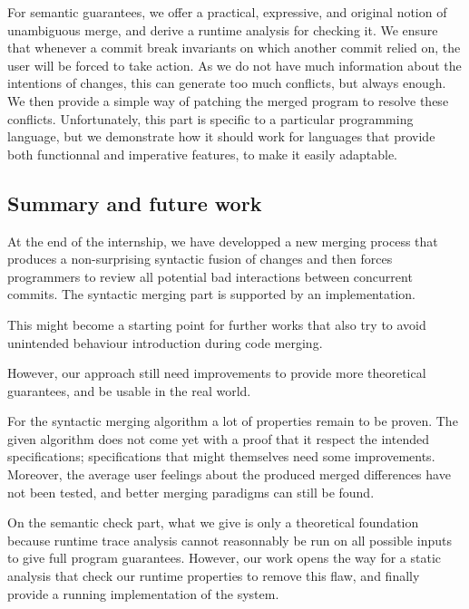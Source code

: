 \documentclass[a4paper,11pt]{article}
\newcommand\todo[1]{{\color{teal}(\textbf{TODO:} #1)}}
\begin{document}
For semantic guarantees, we offer a practical, expressive, and original notion of unambiguous merge, and derive a runtime analysis for checking it. We ensure that whenever a commit break invariants on which another commit relied on, the user will be forced to take action. As we do not have much information about the intentions of changes, this can generate too much conflicts, but always enough. We then provide a simple way of patching the merged program to resolve these conflicts.
Unfortunately, this part is specific to a particular programming language, but we demonstrate how it should work for languages that provide both functionnal and imperative features, to make it easily adaptable.

\subsection*{Summary and future work}


At the end of the internship, we have developped a new merging process that produces a non-surprising syntactic fusion of changes and then forces programmers to review all potential bad interactions between concurrent commits. The syntactic merging part is supported by an implementation.

This might become a starting point for further works that also try to avoid unintended behaviour introduction during code merging.

However, our approach still need improvements to provide more theoretical guarantees, and be usable in the real world. 

For the syntactic merging algorithm a lot of properties remain to be proven. The given algorithm does not come yet with a proof that it respect the intended specifications; specifications that might themselves need some improvements. 
Moreover, the average user feelings about the produced merged differences have not been tested, and better merging paradigms can still be found.

On the semantic check part, what we give is only a theoretical foundation because runtime trace analysis cannot reasonnably be run on all possible inputs to give full program guarantees. However, our work opens the way for a static analysis that check our runtime properties to remove this flaw, and finally provide a running implementation of the system.
\end{document}
